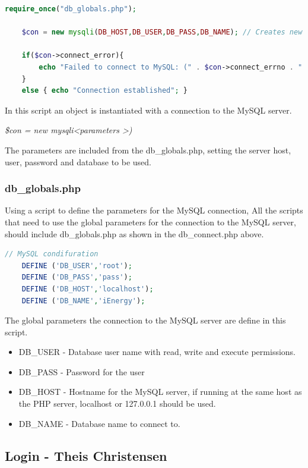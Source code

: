 \begin{lstlisting}[language=php]
	require_once("db_globals.php");
	
	$con = new mysqli(DB_HOST,DB_USER,DB_PASS,DB_NAME); // Creates new mysql connection
	
	if($con->connect_error){
		echo "Failed to connect to MySQL: (" . $con->connect_errno . " ) ". $con->connect_error;
	} 
	else { echo "Connection established"; }
\end{lstlisting}

In this script an object is instantiated with a connection to the MySQL server.

\textit{\$con = new mysqli\textless parameters \textgreater)}

The parameters are included from the db\_globals.php, setting the server host, user, password and database to be used.

\subsubsection{db\_globals.php}

Using a script to define the parameters for the MySQL connection, 
All the scripts that need to use the global parameters for the connection to the MySQL server, should include db\_globals.php as shown in the db\_connect.php above.

\begin{lstlisting}[language=php]
	// MySQL condifuration
	DEFINE ('DB_USER','root');
	DEFINE ('DB_PASS','pass');
	DEFINE ('DB_HOST','localhost');
	DEFINE ('DB_NAME','iEnergy');
\end{lstlisting}

The global parameters the connection to the MySQL server are define in this script.

\begin{itemize}
	\item DB\_USER - Database user name with read, write and execute permissions.
	\item DB\_PASS - Password for the user
	\item DB\_HOST - Hostname for the MySQL server, if running at the same host as the PHP server, localhost or 127.0.0.1 should be used.
	\item DB\_NAME - Database name to connect to.
\end{itemize}

\subsection{Login - Theis Christensen}

